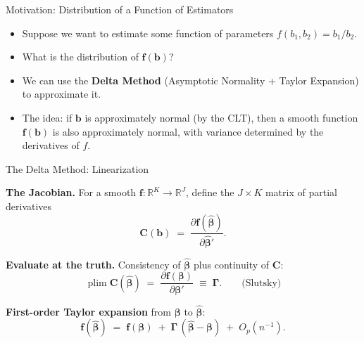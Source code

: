 \documentclass[aspectratio=169, handout, t]{beamer}
\numberwithin{equation}{section}
\begin{document}
\begin{frame}{Motivation: Distribution of a Function of Estimators}
\begin{itemize}
\item Suppose we want to estimate some function of parameters $f(b_1, b_2)=b_1/b_2$.\pause
\item What is the distribution of $\bm{f(b)}$?\pause
\item We can use the \textbf{Delta Method} (Asymptotic Normality + Taylor Expansion) to approximate it.\pause
\item The idea: if $\bm{b}$ is approximately normal (by the CLT), then a smooth function $\bm{f(b)}$ is also approximately normal, with variance determined by the derivatives of $f$.
\end{itemize}
\end{frame}


\begin{frame}{The Delta Method: Linearization}

\textbf{The Jacobian.} For a smooth $\bm{f}: \mathbb{R}^K \to \mathbb{R}^J$, define the $J\times K$ matrix of partial derivatives
\[
\bm{C}(\bm{b}) \;=\; \frac{\partial \bm{f}(\hat{\bm{\beta}})}{\partial \hat{\bm{\beta}}'}.
\]

\pause

\medskip

\textbf{Evaluate at the truth.} Consistency of $\hat{\bm{\beta}}$ plus continuity of $\bm{C}$:
\[
\operatorname{plim}\bm{C}(\hat{\bm{\beta}}) \;=\; \frac{\partial \bm{f}(\bm{\beta})}{\partial \bm{\beta}'} \;\equiv\; \bm{\Gamma}. \qquad\text{(Slutsky)}
\]

\pause

\medskip

\textbf{First-order Taylor expansion} from $\bm{\beta}$ to $\hat{\bm{\beta}}$:
\[
\bm{f}(\hat{\bm{\beta}}) \;=\; \bm{f}(\bm{\beta}) \;+\; \bm{\Gamma}\,(\hat{\bm{\beta}} - \bm{\beta}) \;+\; O_p(n^{-1}).
\]

\end{frame}

\end{document}
